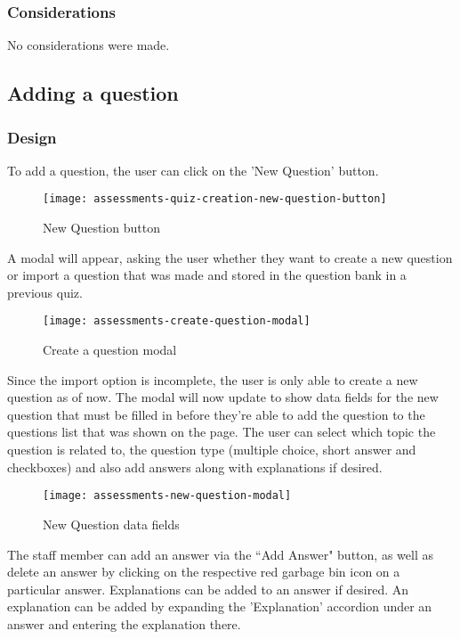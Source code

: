 \subsubsection{Considerations}
No considerations were made.

\subsection{Adding a question}

\subsubsection{Design}
To add a question, the user can click on the 'New Question' button.

\begin{figure}[h!]
	\centering
	\texttt{[image: assessments-quiz-creation-new-question-button]}
	\caption{New Question button}
\end{figure}

A modal will appear, asking the user whether they want to create a new question or import a question that was made and stored in the question bank in a previous quiz. 

\begin{figure}[h!]
	\centering
	\texttt{[image: assessments-create-question-modal]}
	\caption{Create a question modal}
\end{figure}

Since the import option is incomplete, the user is only able to create a new question as of now. The modal will now update to show data fields for the new question that must be filled in before they're able to add the question to the questions list that was shown on the page. The user can select which topic the question is related to, the question type (multiple choice, short answer and checkboxes) and also add answers along with explanations if desired.

\begin{figure}[h!]
	\centering
	\texttt{[image: assessments-new-question-modal]}
	\caption{New Question data fields}
\end{figure}

The staff member can add an answer via the ``Add Answer" button, as well as delete an answer by clicking on the respective red garbage bin icon on a particular answer. Explanations can be added to an answer if desired. An explanation can be added by expanding the 'Explanation' accordion under an answer and entering the explanation there.

